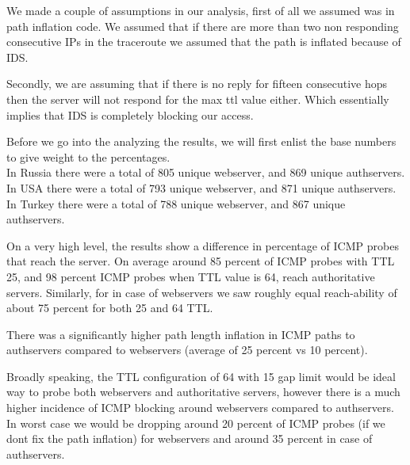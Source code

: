We made a couple of assumptions in our analysis, first of all we assumed was in path inflation code. We assumed that if there are more than two non responding consecutive IPs in the traceroute we assumed that the path is inflated because of IDS. 

Secondly, we are assuming that if there is no reply for fifteen consecutive hops then the server will not respond for the max ttl value either. Which essentially implies that IDS is completely blocking our access.

Before we go into the analyzing the results, we will first enlist the base numbers to give weight to the percentages. \\

In Russia there were a total of 805 unique webserver, and 869 unique authservers.
In USA there were a total of 793 unique webserver, and 871 unique authservers.
In Turkey there were a total of 788 unique webserver, and 867 unique authservers.


On a very high level, the results show a difference in percentage of ICMP probes that reach the server. On average around 85 percent of ICMP probes with TTL 25, and 98 percent ICMP probes when TTL value is 64, reach authoritative servers. Similarly, for in case of webservers we saw roughly equal reach-ability of about 75 percent for both 25 and 64 TTL. 

There was a significantly higher path length inflation in ICMP paths to authservers compared to webservers (average of 25 percent vs 10 percent). 

Broadly speaking, the TTL configuration of 64 with 15 gap limit would be ideal way to probe both webservers and authoritative servers, however there is a much higher incidence of ICMP blocking around webservers compared to authservers. In worst case we would be dropping around 20 percent of ICMP probes (if we dont fix the path inflation) for webservers and around 35 percent in case of authservers.

